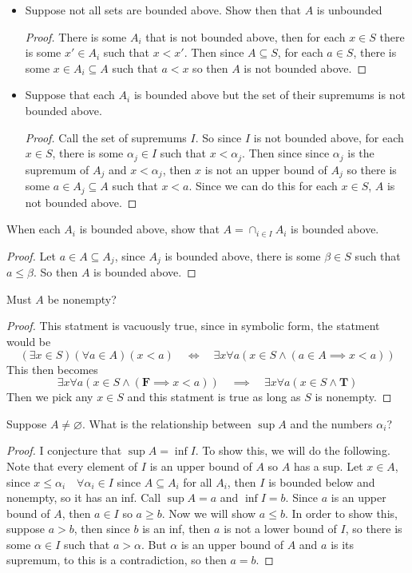 \documentclass[11pt]{article}
\newenvironment{bp}{\color{blue}\begin{proof}}{\end{proof}}
\renewcommand{\subset}{\subseteq}
\let\null\varnothing
\begin{document}
\begin{itemize}
  \item Suppose not all sets are bounded above. Show then that $A$ is unbounded
    \begin{bp}
      There is some $A_i$ that is not bounded above, then for each $x\in S$ there is some $x'\in A_i$ such that $x < x'$. Then since $A\subset S$, for each $a\in S$, there is some $x\in A_i\subset A$ such that $a < x$ so then $A$ is not bounded above.
    \end{bp}
  \item Suppose that each $A_i$ is bounded above but the set of their supremums is not bounded above.
    \begin{bp} 
    Call the set of supremums $I$. So since $I$ is not bounded above, for each $x\in S$, there is some $\alpha_j\in I$ such that $x < \alpha_j$. Then since since $\alpha_j$ is the supremum of $A_j$ and $x<\alpha_j$, then $x$ is not an upper bound of $A_j$ so there is some $a\in A_j\subset A$ such that $x < a$. Since we can do this for each $x\in S$, $A$ is not bounded above.
    \end{bp}
\end{itemize}

When each $A_i$ is bounded above, show that $A = \cap_{i\in I}A_i$ is bounded above. 
\begin{bp}
  Let $a\in A \subset A_j$, since $A_j$ is bounded above, there is some $\beta\in S$ such that $a\leq \beta$. So then $A$ is bounded above. 
\end{bp}
Must $A$ be nonempty? 
\begin{bp}
  This statment is vacuously true, since in symbolic form, the statment would be 
  \[
    \left( \exists x\in S \right)\left( \forall a\in A \right)\left( x < a \right)\quad\iff\quad \exists x\forall a\left( x\in S\wedge\left( a\in A \implies x < a \right) \right)
  \]
  This then becomes 
  \[
    \exists x\forall a\left( x\in S\wedge\left( \mathbf{F} \implies x < a \right) \right)\quad\implies\quad \exists x\forall a \left( x\in S \land \mathbf{T} \right)
  \]
  Then we pick any $x\in S$ and this statment is true as long as $S$ is nonempty.
\end{bp}
Suppose $A \neq \null$. What is the relationship between $\sup A$ and the numbers $\alpha_i$?
\begin{bp}
I conjecture that $\sup A = \inf I$. To show this, we will do the following. Note that every element of $I$ is an upper bound of $A$ so $A$ has a sup. Let $x\in A$, since $x \leq \alpha_i\quad \forall \alpha_i\in I$ since $A\subset A_i$ for all $A_i$, then $I$ is bounded below and nonempty, so it has an inf. Call $\sup A = a$ and $\inf I = b$. Since $a$ is an upper bound of $A$, then $a\in I$ so $a \geq b$. Now we will show $a\leq b$. In order to show this, suppose $a > b$, then since $b$ is an inf, then $a$ is not a lower bound of $I$, so there is some $\alpha\in I$ such that $a > \alpha$. But $\alpha$ is an upper bound of $A$ and $a$ is its supremum, to this is a contradiction, so then $a = b$. 
\end{bp}
\end{document}
